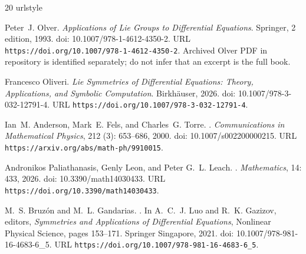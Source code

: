 \documentclass[11pt]{article}
\theoremstyle{definition}
\begin{document}
\clearpage
\begingroup
\small
\setlength{\bibsep}{4pt plus 1pt minus 1pt}
\begin{thebibliography}{20}
\providecommand{\natexlab}[1]{#1}
\providecommand{\url}[1]{\texttt{#1}}
\expandafter\ifx\csname urlstyle\endcsname\relax
  \providecommand{\doi}[1]{doi: #1}\else
  \providecommand{\doi}{doi: \begingroup \urlstyle{rm}\Url}\fi

Peter~J. Olver.
\newblock \emph{{Applications of Lie Groups to Differential Equations}}.
\newblock Springer, 2 edition, 1993.
\newblock \doi{10.1007/978-1-4612-4350-2}.
\newblock URL \url{https://doi.org/10.1007/978-1-4612-4350-2}.
\newblock Archived Olver PDF in repository is identified separately; do not
  infer that an excerpt is the full book.

Francesco Oliveri.
\newblock \emph{{Lie Symmetries of Differential Equations: Theory,
  Applications, and Symbolic Computation}}.
\newblock Birkh{\"a}user, 2026.
\newblock \doi{10.1007/978-3-032-12791-4}.
\newblock URL \url{https://doi.org/10.1007/978-3-032-12791-4}.

Ian~M. Anderson, Mark~E. Fels, and Charles~G. Torre.
.
\newblock \emph{Communications in Mathematical Physics}, 212
  (3): 653--686, 2000.
\newblock \doi{10.1007/s002200000215}.
\newblock URL \url{https://arxiv.org/abs/math-ph/9910015}.

Andronikos Paliathanasis, Genly Leon, and Peter G.~L. Leach.
.
\newblock \emph{Mathematics}, 14: 433, 2026.
\newblock \doi{10.3390/math14030433}.
\newblock URL \url{https://doi.org/10.3390/math14030433}.

M.~S. Bruz\'{o}n and M.~L. Gandarias.
.
\newblock In A.~C.~J. Luo and R.~K. Gazizov, editors,
\emph{Symmetries and Applications of Differential Equations},
Nonlinear Physical Science, pages 153--171. Springer Singapore, 2021.
\newblock \doi{10.1007/978-981-16-4683-6_5}.
\newblock URL \url{https://doi.org/10.1007/978-981-16-4683-6_5}.


\end{thebibliography}
\end{document}
